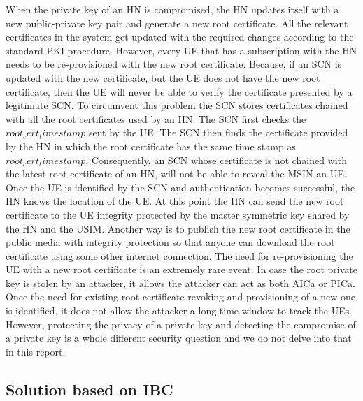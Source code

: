 \documentclass[lnicst,sechang,a4paper]{svmultln}
\begin{document}
When the private key of an HN is compromised, the HN updates itself with a new public-private key pair and generate a new root certificate. All the relevant certificates in the system get updated with the required changes according to the standard PKI procedure. However, every UE that has a subscription with the HN needs to be re-provisioned with the new root certificate. Because, if an SCN is updated with the new certificate, but the UE does not have the new root certificate, then the UE will never be able to verify the certificate presented by a legitimate SCN. To circumvent this problem the SCN stores certificates chained with all the root certificates used by an HN. The SCN first checks the $root_cert_timestamp$ sent by the UE. The SCN then finds the certificate provided by the HN in which the root certificate has the same time stamp as $root_cert_timestamp$. Consequently, an SCN whose certificate is not chained with the latest root certificate of an HN, will not be able to reveal the MSIN an UE. Once the UE is identified by the SCN and authentication becomes successful, the HN knows the location of the UE. At this point the HN can send the new root certificate to the UE integrity protected by the master symmetric key shared by the HN and the USIM. Another way is to publish the new root certificate in the public media with integrity protection so that anyone can download the root certificate using some other internet connection. The need for re-provisioning the UE with a new root certificate is an extremely rare event. In case the root private key is stolen by an attacker, it allows the attacker can act as both AICa or PICa. Once the need for existing root certificate revoking and provisioning of a new one is identified, it does not allow the attacker a long time window to track the UEs. However, protecting the privacy of a private key and detecting the compromise of a private key is a whole different security question and we do not delve into that in this report.


\subsection{Solution based on IBC} 
\label{sub_sec:solution_ibc}
\end{document}
